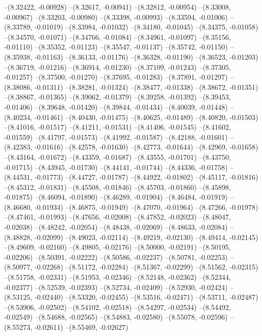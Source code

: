 --(8.32422, -0.00928)
--(8.32617, -0.00941)
--(8.32812, -0.00954)
--(8.33008, -0.00967)
--(8.33203, -0.00980)
--(8.33398, -0.00993)
--(8.33594, -0.01006)
--(8.33789, -0.01019)
--(8.33984, -0.01032)
--(8.34180, -0.01045)
--(8.34375, -0.01058)
--(8.34570, -0.01071)
--(8.34766, -0.01084)
--(8.34961, -0.01097)
--(8.35156, -0.01110)
--(8.35352, -0.01123)
--(8.35547, -0.01137)
--(8.35742, -0.01150)
--(8.35938, -0.01163)
--(8.36133, -0.01176)
--(8.36328, -0.01190)
--(8.36523, -0.01203)
--(8.36719, -0.01216)
--(8.36914, -0.01230)
--(8.37109, -0.01243)
--(8.37305, -0.01257)
--(8.37500, -0.01270)
--(8.37695, -0.01283)
--(8.37891, -0.01297)
--(8.38086, -0.01311)
--(8.38281, -0.01324)
--(8.38477, -0.01338)
--(8.38672, -0.01351)
--(8.38867, -0.01365)
--(8.39062, -0.01379)
--(8.39258, -0.01392)
--(8.39453, -0.01406)
--(8.39648, -0.01420)
--(8.39844, -0.01434)
--(8.40039, -0.01448)
--(8.40234, -0.01461)
--(8.40430, -0.01475)
--(8.40625, -0.01489)
--(8.40820, -0.01503)
--(8.41016, -0.01517)
--(8.41211, -0.01531)
--(8.41406, -0.01545)
--(8.41602, -0.01559)
--(8.41797, -0.01573)
--(8.41992, -0.01587)
--(8.42188, -0.01601)
--(8.42383, -0.01616)
--(8.42578, -0.01630)
--(8.42773, -0.01644)
--(8.42969, -0.01658)
--(8.43164, -0.01672)
--(8.43359, -0.01687)
--(8.43555, -0.01701)
--(8.43750, -0.01715)
--(8.43945, -0.01730)
--(8.44141, -0.01744)
--(8.44336, -0.01758)
--(8.44531, -0.01773)
--(8.44727, -0.01787)
--(8.44922, -0.01802)
--(8.45117, -0.01816)
--(8.45312, -0.01831)
--(8.45508, -0.01846)
--(8.45703, -0.01860)
--(8.45898, -0.01875)
--(8.46094, -0.01890)
--(8.46289, -0.01904)
--(8.46484, -0.01919)
--(8.46680, -0.01934)
--(8.46875, -0.01949)
--(8.47070, -0.01964)
--(8.47266, -0.01978)
--(8.47461, -0.01993)
--(8.47656, -0.02008)
--(8.47852, -0.02023)
--(8.48047, -0.02038)
--(8.48242, -0.02054)
--(8.48438, -0.02069)
--(8.48633, -0.02084)
--(8.48828, -0.02099)
--(8.49023, -0.02114)
--(8.49219, -0.02130)
--(8.49414, -0.02145)
--(8.49609, -0.02160)
--(8.49805, -0.02176)
--(8.50000, -0.02191)
--(8.50195, -0.02206)
--(8.50391, -0.02222)
--(8.50586, -0.02237)
--(8.50781, -0.02253)
--(8.50977, -0.02268)
--(8.51172, -0.02284)
--(8.51367, -0.02299)
--(8.51562, -0.02315)
--(8.51758, -0.02331)
--(8.51953, -0.02346)
--(8.52148, -0.02362)
--(8.52344, -0.02377)
--(8.52539, -0.02393)
--(8.52734, -0.02409)
--(8.52930, -0.02424)
--(8.53125, -0.02440)
--(8.53320, -0.02455)
--(8.53516, -0.02471)
--(8.53711, -0.02487)
--(8.53906, -0.02502)
--(8.54102, -0.02518)
--(8.54297, -0.02534)
--(8.54492, -0.02549)
--(8.54688, -0.02565)
--(8.54883, -0.02580)
--(8.55078, -0.02596)
--(8.55273, -0.02611)
--(8.55469, -0.02627)
